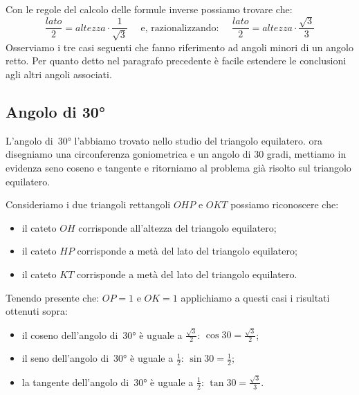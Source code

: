 Con le regole del calcolo delle formule inverse possiamo trovare che:
\[\frac{lato}{2} = altezza \cdot \frac{1}{\sqrt{3}} \quad 
\text{ e, razionalizzando: } \quad 
  \frac{lato}{2} = altezza \cdot \frac{\sqrt{3}}{3}\]
Osserviamo i tre casi seguenti che fanno riferimento ad angoli minori di un
angolo retto. Per quanto detto nel paragrafo precedente è facile estendere le
conclusioni agli altri angoli associati.

\subsection{Angolo di 30°}

L'angolo di~30° l'abbiamo trovato nello studio del triangolo equilatero. ora 
disegniamo una circonferenza goniometrica e un angolo di 30 gradi, mettiamo 
in evidenza seno coseno e tangente e ritorniamo al problema già risolto sul 
triangolo equilatero.\\

 \begin{minipage}{.45\textwidth}
  \begin{center}
\begin{inaccessibleblock}
    
\end{inaccessibleblock}
  \end{center}
 \end{minipage}
 \begin{minipage}{.45\textwidth}
Consideriamo i due triangoli rettangoli \(OHP\) e \(OKT\) possiamo riconoscere 
che:
\begin{itemize} [noitemsep]
 \item il cateto \(OH\) corrisponde all'altezza del triangolo equilatero; 
 \item il cateto \(HP\) corrisponde a metà del lato del triangolo equilatero;
 \item il cateto \(KT\) corrisponde a metà del lato del triangolo equilatero.\\
\end{itemize}
 \end{minipage}

Tenendo presente che: \(OP=1\) e \(OK=1\) applichiamo a questi casi i risultati 
ottenuti sopra:
\begin{itemize} [noitemsep]
 \item il coseno dell'angolo di~30° è uguale a \(\frac{\sqrt{3}}{2}\): 
  \(\cos 30 = \frac{\sqrt{3}}{2}\); 
 \item il seno dell'angolo di~30° è uguale a \(\frac{1}{2}\): 
  \(\sin 30 = \frac{1}{2}\); 
 \item la tangente dell'angolo di~30° è uguale a \(\frac{1}{2}\): 
  \(\tan 30 = \frac{\sqrt{3}}{3}\).
\end{itemize}

